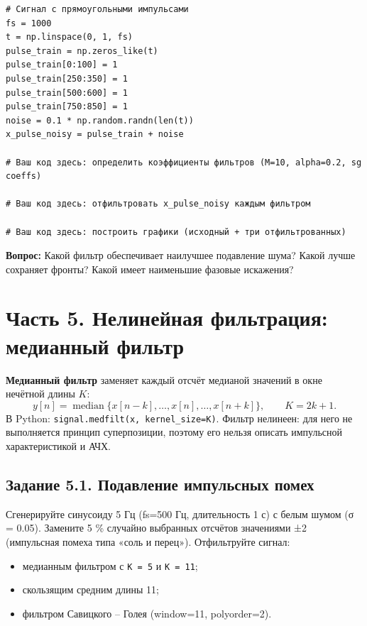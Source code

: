 \documentclass[12pt,a4paper,openany]{book}
\providecommand{\tightlist}{\setlength{\itemsep}{0pt}\setlength{\parskip}{0pt}}
\begin{document}
\begin{Verbatim}[fontsize=\small, breaklines, breakanywhere, frame=single, framesep=2mm]
# Сигнал с прямоугольными импульсами
fs = 1000
t = np.linspace(0, 1, fs)
pulse_train = np.zeros_like(t)
pulse_train[0:100] = 1
pulse_train[250:350] = 1
pulse_train[500:600] = 1
pulse_train[750:850] = 1
noise = 0.1 * np.random.randn(len(t))
x_pulse_noisy = pulse_train + noise

# Ваш код здесь: определить коэффициенты фильтров (M=10, alpha=0.2, sg coeffs)

# Ваш код здесь: отфильтровать x_pulse_noisy каждым фильтром

# Ваш код здесь: построить графики (исходный + три отфильтрованных)
\end{Verbatim}

\textbf{Вопрос:} Какой фильтр обеспечивает наилучшее подавление шума? Какой лучше сохраняет фронты? Какой имеет наименьшие фазовые искажения?

\section*{Часть 5. Нелинейная фильтрация: медианный фильтр}

\textbf{Медианный фильтр} заменяет каждый отсчёт медианой значений в окне нечётной длины \(K\):
\[
y[n] = \operatorname{median}\{x[n-k], \dots, x[n], \dots, x[n+k]\}, \qquad K = 2k+1.
\]
В Python: \texttt{signal.\allowbreak{}medfilt(\allowbreak{}x,\allowbreak{}\ kernel\_\allowbreak{}size=\allowbreak{}K)}. Фильтр нелинеен: для него не выполняется принцип суперпозиции, поэтому его нельзя описать импульсной характеристикой и АЧХ.

\subsection*{Задание 5.1. Подавление импульсных помех}

Сгенерируйте синусоиду 5 Гц (fs=500 Гц, длительность 1 с) с белым шумом (σ = 0.05). Замените 5 \% случайно выбранных отсчётов значениями ±2 (импульсная помеха типа «соль и перец»). Отфильтруйте сигнал:

\begin{itemize}
\tightlist
\item
  медианным фильтром с \texttt{K\ =\allowbreak{}\ 5} и \texttt{K\ =\allowbreak{}\ 11};
\item
  скользящим средним длины 11;
\item
  фильтром Савицкого -- Голея (window=11, polyorder=2).
\end{itemize}
\end{document}

